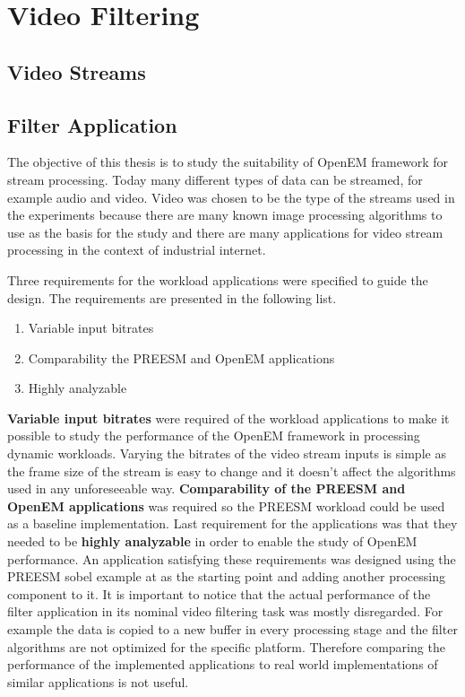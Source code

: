 \chapter{Video Filtering}
\section{Video Streams}

\section{Filter Application}
\label{sec:filterapp}
The objective of this thesis is to study the suitability of OpenEM framework for stream processing. Today many different types of data can be streamed, for example audio and video. Video was chosen to be the type of the streams used in the experiments because there are many known image processing algorithms to use as the basis for the study and there are many applications for video stream processing in the context of industrial internet. 

Three requirements for the workload applications were specified to guide the design. The requirements are presented in the following list.

\begin{enumerate}
    \item{Variable input bitrates}
    \item{Comparability the PREESM and OpenEM applications}
    \item{Highly analyzable}
\end{enumerate}

\textbf{Variable input bitrates} were required of the workload applications to make it possible to study the performance of the OpenEM framework in processing dynamic workloads. Varying the bitrates of the video stream inputs is simple as the frame size of the stream is easy to change and it doesn't affect the algorithms used in any unforeseeable way. \textbf{Comparability of the PREESM and OpenEM applications} was required so the PREESM workload could be used as a baseline implementation. Last requirement for the applications was that they needed to be \textbf{highly analyzable} in order to enable the study of OpenEM performance. An application satisfying these requirements was designed using the PREESM sobel example at \cite{preesmtut} as the starting point and adding another processing component to it. It is important to notice that the actual performance of the filter application in its nominal video filtering task was mostly disregarded. For example the data is copied to a new buffer in every processing stage and the filter algorithms are not optimized for the specific platform. Therefore comparing the performance of the implemented applications to real world implementations of similar applications is not useful.

